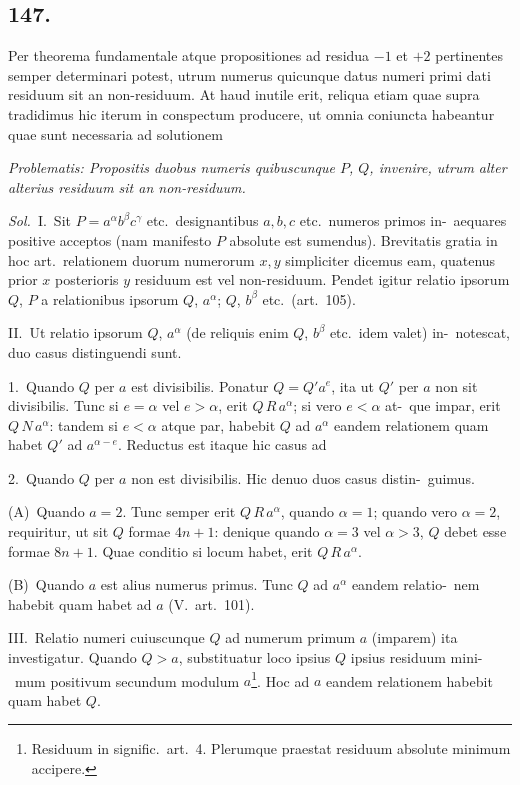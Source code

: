 \documentclass[12pt,a4paper]{article}
\theoremstyle{plain}
\theoremstyle{definition}
\theoremstyle{remark}
\begin{document}
\subsection*{147.}

Per theorema fundamentale atque propositiones ad residua $-1$ et $+2$
pertinentes semper determinari potest, utrum numerus quicunque datus numeri
primi dati residuum sit an non-residuum. At haud inutile erit, reliqua etiam
quae supra tradidimus hic iterum in conspectum producere, ut omnia coniuncta
habeantur quae sunt necessaria ad solutionem

\emph{Problematis: Propositis duobus numeris quibuscunque $P$, $Q$, invenire, utrum
alter alterius residuum sit an non-residuum.}

\emph{Sol.}\ I.\ Sit $P = a^\alpha b^\beta c^\gamma$ etc.\ designantibus $a,b,c$ etc.\ numeros primos in-\ aequares positive acceptos (nam manifesto $P$ absolute est sumendus). Brevitatis
gratia in hoc art.\ relationem duorum numerorum $x,y$ simpliciter dicemus eam,
quatenus prior $x$ posterioris $y$ residuum est vel non-residuum. Pendet igitur
relatio ipsorum $Q$, $P$ a relationibus ipsorum $Q$, $a^\alpha$; $Q$, $b^\beta$ etc.\ (art.~105).

II.\ Ut relatio ipsorum $Q$, $a^\alpha$ (de reliquis enim $Q$, $b^\beta$ etc.\ idem valet) in-\ notescat, duo casus distinguendi sunt.

1.\ Quando $Q$ per $a$ est divisibilis. Ponatur $Q = Q'a^e$, ita ut $Q'$ per
$a$ non sit divisibilis. Tunc si $e = \alpha$ vel $e > \alpha$, erit $Q \, R \, a^\alpha$; si vero $e < \alpha$ at-\ que impar, erit $Q \, N \, a^\alpha$: tandem si $e < \alpha$ atque par, habebit $Q$ ad $a^\alpha$ eandem
relationem quam habet $Q'$ ad $a^{\alpha-e}$. Reductus est itaque hic casus ad

2.\ Quando $Q$ per $a$ non est divisibilis. Hic denuo duos casus distin-\ guimus.

(A)\ Quando $a = 2$. Tunc semper erit $Q \, R \, a^\alpha$, quando $\alpha = 1$; quando
vero $\alpha = 2$, requiritur, ut sit $Q$ formae $4n+1$: denique quando $\alpha = 3$ vel
$\alpha > 3$, $Q$ debet esse formae $8n+1$. Quae conditio si locum habet, erit $Q \, R \, a^\alpha$.

(B)\ Quando $a$ est alius numerus primus. Tunc $Q$ ad $a^\alpha$ eandem relatio-\ nem habebit quam habet ad $a$ (V.\ art.~101).

III.\ Relatio numeri cuiuscunque $Q$ ad numerum primum $a$ (imparem) ita
investigatur. Quando $Q > a$, substituatur loco ipsius $Q$ ipsius residuum mini-\ mum positivum secundum modulum $a$\footnote{Residuum in signific.\ art.~4. Plerumque praestat residuum absolute minimum accipere.}. Hoc ad $a$ eandem relationem habebit
quam habet $Q$.
\end{document}

